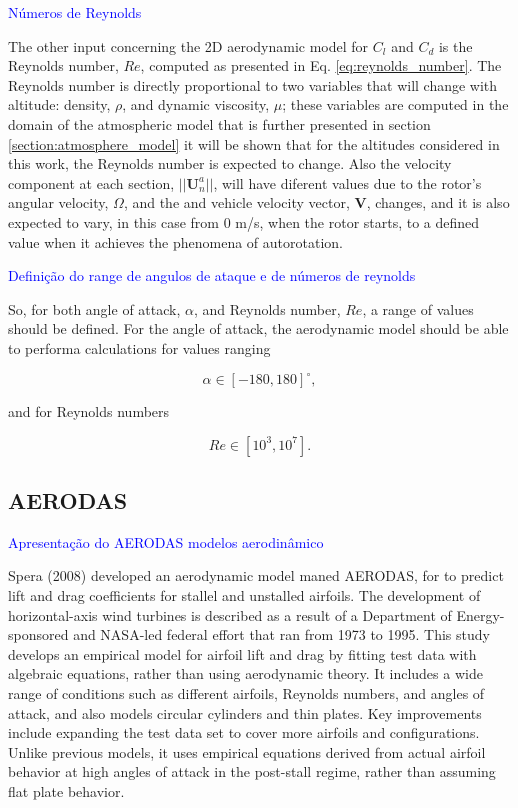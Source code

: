 \textcolor{blue}{Números de Reynolds} 

The other input concerning the 2D aerodynamic model for $C_l$ and $C_d$ is the Reynolds number, $Re$, computed as presented in Eq. \ref{eq:reynolds_number}. The Reynolds number is directly proportional to two variables that will change with altitude: density, $\rho$, and dynamic viscosity, $\mu$; these variables are computed in the domain of the atmospheric model that is further presented in section \ref{section:atmosphere_model} it will be shown that for the altitudes considered in this work, the Reynolds number is expected to change. Also the velocity component at each section, $||\mathbf{U}^a_n||$, will have diferent values due to the rotor's angular velocity, $\Omega$, and the and vehicle velocity vector, $\mathbf{V}$, changes, and it is also expected to vary, in this case from 0 \unit{m/s}, when the rotor starts, to a defined value when it achieves the phenomena of autorotation.

\textcolor{blue}{Definição do range de angulos de ataque e de números de reynolds} 

So, for both angle of attack, $\alpha$, and Reynolds number, $Re$, a range of values should be defined. For the angle of attack, the aerodynamic model should be able to performa calculations for values ranging 

\begin{equation}
    \alpha \in [-180, 180] ^{\circ},
\end{equation}

and for Reynolds numbers

\begin{equation}
    Re \in [10^3, 10^7].
\end{equation}

\subsection{AERODAS}
\label{sec:aerodas}

\textcolor{blue}{Apresentação do AERODAS modelos aerodinâmico} 

Spera (2008) \cite{spera_models_2008} developed an aerodynamic model  maned AERODAS, for to predict lift and drag coefficients for stallel and unstalled airfoils. The development of horizontal-axis wind turbines is described as a result of a Department of Energy-sponsored and NASA-led federal effort that ran from 1973 to 1995. This study develops an empirical model for airfoil lift and drag by fitting test data with algebraic equations, rather than using aerodynamic theory. It includes a wide range of conditions such as different airfoils, Reynolds numbers, and angles of attack, and also models circular cylinders and thin plates. Key improvements include expanding the test data set to cover more airfoils and configurations. Unlike previous models, it uses empirical equations derived from actual airfoil behavior at high angles of attack in the post-stall regime, rather than assuming flat plate behavior.

